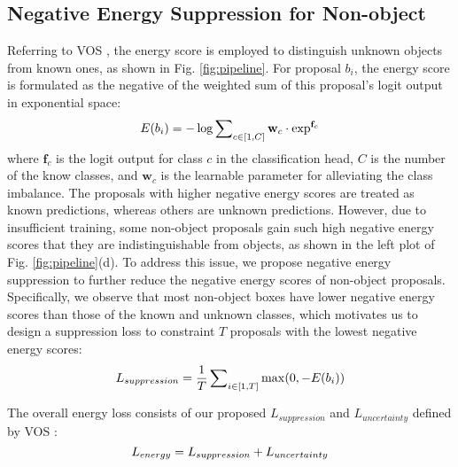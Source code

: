 \documentclass[10pt,twocolumn,letterpaper]{article}
\newcommand{\xf}[1]{{\color{black} #1}}
\begin{document}
\subsection{Negative Energy Suppression for Non-object}
\label{sec:Energy_Suppression}

Referring to VOS \cite{vos},
the energy score is employed to distinguish unknown objects from known ones,
as shown in Fig. \ref{fig:pipeline}.
For proposal $b_i$,
the energy score is formulated as the negative of the weighted sum of this proposal's logit output in exponential space:
\begin{equation}
E(b_i)=-\log \sum\nolimits_{c\in[1,C]} \mathbf{w}_{c} \cdot \exp ^{\mathbf{f}_{c}}
\label{eq:energy}
\vspace{-5pt}
\end{equation}
where $\mathbf{f}_{c}$ is the logit output for class $c$ in the classification head,
$C$ is the number of the know classes,
and $\mathbf{w}_{c}$ is the learnable parameter for alleviating the class imbalance.
The proposals with higher negative energy scores are treated as known predictions,
\xf{whereas} others are unknown predictions.
However, due to insufficient training,
some non-object proposals gain such high negative energy scores that they are indistinguishable from objects, as shown in the left plot of Fig. \ref{fig:pipeline}(d).
To address this issue,
we propose negative energy suppression to further reduce the negative energy scores of non-object proposals.
Specifically,
we observe that most non-object boxes have lower negative energy scores than \xf{those} of the known and unknown classes,
which motivates us to design a suppression loss to constraint $T$ proposals with the lowest negative energy scores:
\vspace{-5pt}
\begin{equation}
L_{suppression} = \frac{1}{T} \sum\nolimits_{i\in[1,T]} \max(0, -E(b_i))
\label{eq:loss_suppression}
\vspace{-5pt}
\end{equation}

The overall energy loss consists of our proposed $L_{suppression}$ and $L_{uncertainty}$ defined by VOS \cite{vos}:
\vspace{-5pt}
\begin{equation}
L_{energy} = L_{suppression} + L_{uncertainty}
\label{eq:loss_energy}
\vspace{-5pt}
\end{equation}
\end{document}
